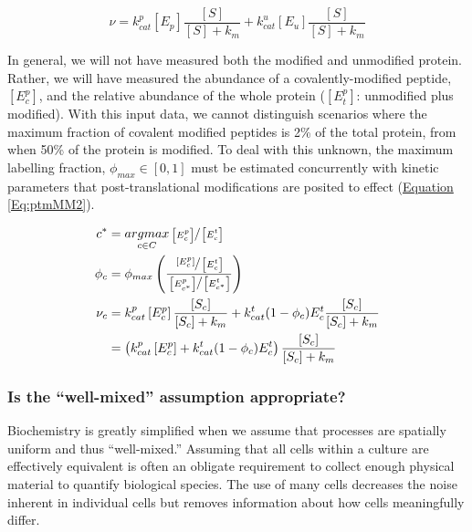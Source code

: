 \begin{equation}
\nu = k_{cat}^{p}\left[E_{p}\right]\frac{\left[S\right]}{\left[S\right] + k_{m}} + k_{cat}^{u}\left[E_{u}\right]\frac{\left[S\right]}{\left[S\right] + k_{m}}\label{Eq:ptmMM1}
\end{equation}

In general, we will not have measured both the modified and unmodified protein. Rather, we will have measured the abundance of a covalently-modified peptide, $\left[E^{p}_{c}\right]$, and the relative abundance of the whole protein ($\left[E^{p}_{t}\right]$: unmodified plus modified). With this input data, we cannot distinguish scenarios where the maximum fraction of covalent modified peptides is 2\% of the total protein, from when 50\% of the protein is modified. To deal with this unknown, the maximum labelling fraction, $\phi_{max} \in [0, 1]$ must be estimated concurrently with kinetic parameters that post-translational modifications are posited to effect (\hyperref[Eq:ptmMM2]{Equation \ref{Eq:ptmMM2}}).

\begin{align}
c^{*} &= \underset{c\in C}{argmax} \sfrac{\left[E^{p}_{c}\right]}{\left[E^{t}_{c}\right]}\notag\\
\phi_{c} &= \phi_{max}\left(\frac{\sfrac{\left[E^{p}_{c}\right]}{\left[E^{t}_{c}\right]}}{\sfrac{\left[E^{p}_{c^*}\right]}{\left[E^{t}_{c^*}\right]}}\right)\notag\\
\nu_c &= k_{cat}^{p}\left[E_c^{p}\right]\frac{\left[S_c\right]}{\left[S_c\right] + k_{m}} + k_{cat}^{t}(1-\phi_c)E_{c}^{t}\frac{\left[S_c\right]}{\left[S_c\right] + k_{m}}\notag\\
 &= \left(k_{cat}^{p}\left[E_c^{p}\right] + k_{cat}^{t}(1-\phi_c)E_{c}^{t}\right) \frac{\left[S_c\right]}{\left[S_c\right] + k_{m}}\label{Eq:ptmMM2}
\end{align}

\subsubsection{Is the ``well-mixed'' assumption appropriate?}

Biochemistry is greatly simplified when we assume that processes are spatially uniform and thus ``well-mixed.'' Assuming that all cells within a culture are effectively equivalent is often an obligate requirement to collect enough physical material to quantify biological species. The use of many cells decreases the noise inherent in individual cells but removes information about how cells meaningfully differ. 

